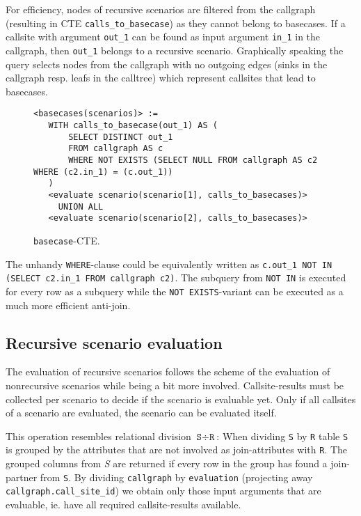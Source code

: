 For efficiency, nodes of recursive scenarios are filtered from the callgraph (resulting in CTE \texttt{calls\_to\_basecase}) as they cannot belong to basecases. If a callsite with argument \texttt{out\_1} can be found as input argument \texttt{in\_1} in the callgraph, then \texttt{out\_1} belongs to a recursive scenario. Graphically speaking the query selects nodes from the callgraph with no outgoing edges (sinks in the callgraph resp. leafs in the calltree) which represent callsites that lead to basecases.

\begin{figure}[h!]
    \centering
    \begin{verbatim}
<basecases(scenarios)> := 
   WITH calls_to_basecase(out_1) AS (
       SELECT DISTINCT out_1 
       FROM callgraph AS c
       WHERE NOT EXISTS (SELECT NULL FROM callgraph AS c2 WHERE (c2.in_1) = (c.out_1))
   )
   <evaluate scenario(scenario[1], calls_to_basecases)>
     UNION ALL 
   <evaluate scenario(scenario[2], calls_to_basecases)>
    \end{verbatim}
    \caption{\texttt{basecase}-CTE.}
    \label{macro:basecases}
\end{figure}

The unhandy \texttt{WHERE}-clause could be equivalently written as \texttt{c.out_1 NOT IN (SELECT c2.in_1 FROM callgraph c2)}. %
The subquery from \texttt{NOT IN} is executed for every row as a subquery while the \texttt{NOT EXISTS}-variant can be executed as a much more efficient anti-join.

\subsection{Recursive scenario evaluation}

The evaluation of recursive scenarios follows the scheme of the evaluation of nonrecursive scenarios while being a bit more involved. Callsite-results must be collected per scenario to decide if the scenario is evaluable yet. Only if all callsites of a scenario are evaluated, the scenario can be evaluated itself.

This operation resembles relational division $\texttt{S} \div \texttt{R}$: When dividing \texttt{S} by \texttt{R} table \texttt{S} is grouped by the attributes that are not involved as join-attributes with \texttt{R}. The grouped columns from \textit{S} are returned if every row in the group has found a join-partner from \texttt{S}. By dividing \texttt{callgraph} by \texttt{evaluation} (projecting away \texttt{callgraph.call\_site\_id}) we obtain only those input arguments that are evaluable, ie. have all required callsite-results available.

